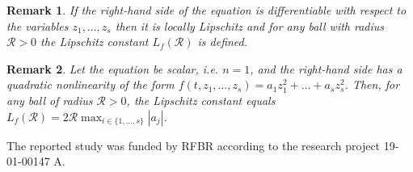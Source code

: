 \documentclass[
11pt,%
tightenlines,%
twoside,%
onecolumn,%
nofloats,%
nobibnotes,%
nofootinbib,%
superscriptaddress,%
noshowpacs,%
centertags,aps]%
{revtex4}
\newtheorem{remark}{Remark}
\begin{document}
\begin{remark}
If the right-hand side of the equation is differentiable with respect to the variables $z_1,\ldots,z_s$ then it is locally Lipschitz and for any ball with radius $\mathcal R>0$ the Lipschitz constant $L_f(\mathcal R)$ is defined.
\end{remark}

\begin{remark}
Let the equation be scalar, i.e. $n=1$, and the right-hand side has a quadratic nonlinearity of the form $f(t,z_1,\ldots,z_s)=a_1z_1^2+ \ldots +a_s z_s^2$. Then, for any ball of radius $\mathcal R>0$, the Lipschitz constant equals $L_f(\mathcal R)=2 \mathcal R\max_{i\in \{1,\ldots,s\}} |a_j|$.
\end{remark}

\begin{acknowledgments}
The reported study was funded by RFBR according to the research project 19-01-00147 A.
\end{acknowledgments}


%
%
\end{document}
